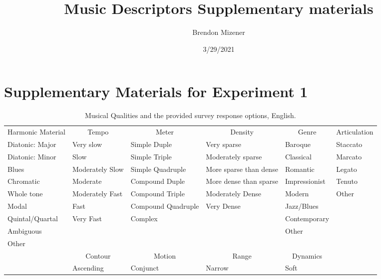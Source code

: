 \documentclass[
]{article}
\title{Music Descriptors Supplementary materials}
\author{Brendon Mizener}
\date{3/29/2021}
\makeatletter
\newenvironment{lltable}{\begin{landscape}\begin{center}\begin{ThreePartTable}}{\end{ThreePartTable}\end{center}\end{landscape}}
\newcommand\LastLTentrywidth{1em}
\newlength\longtablewidth
\newcommand{\getlongtablewidth}{\begingroup \ifcsname LT@\roman{LT@tables}\endcsname \global\longtablewidth=0pt \renewcommand{\LT@entry}[2]{\global\advance\longtablewidth by ##2\relax\gdef\LastLTentrywidth{##2}}\@nameuse{LT@\roman{LT@tables}} \fi \endgroup}
\makeatother
\begin{document}
\maketitle

\hypertarget{supplementary-materials-for-experiment-1}{%
\section{Supplementary Materials for Experiment
1}\label{supplementary-materials-for-experiment-1}}

\begin{lltable}
\begin{footnotesize}
\begin{longtable}{p{}p{}p{}p{}p{}p{}}\noalign{\getlongtablewidth\global\LTcapwidth=\longtablewidth}
\caption{\label{tab:qualitiestable}Musical Qualities and the provided survey response options, English.}\\
\toprule[.8pt]
 \multicolumn{1}{c}{Harmonic Material} & \multicolumn{1}{c}{Tempo} & \multicolumn{1}{c}{Meter} & \multicolumn{1}{c}{Density} & \multicolumn{1}{c}{Genre} & \multicolumn{1}{c}{Articulation}\\
 \midrule
      Diatonic: Major & Very slow & Simple Duple & Very sparse & Baroque & Staccato \\
      Diatonic: Minor & Slow & Simple Triple & Moderately sparse & Classical & Marcato \\
      Blues & Moderately Slow & Simple Quadruple  & More sparse than dense & Romantic & Legato\\
      Chromatic & Moderate & Compound Duple & More dense than sparse & Impressionist & Tenuto\\
      Whole tone & Moderately Fast & Compound Triple & Moderately Dense & Modern & Other \\       
      Modal  & Fast & Compound Quadruple & Very Dense & Jazz/Blues & \\
      Quintal/Quartal  & Very Fast & Complex & & Contemporary & \\
      Ambiguous  & & & & Other & \\
      Other  & & & & & \\
\bottomrule\addlinespace[.5em]
 & \multicolumn{1}{c}{Contour} & \multicolumn{1}{c}{Motion} & \multicolumn{1}{c}{Range} & \multicolumn{1}{c}{Dynamics} & \\
 \cmidrule[.5pt]{2-5}
  & Ascending & Conjunct & Narrow & Soft & \\

\end{longtable}
\end{footnotesize}
\end{lltable}
\end{document}
